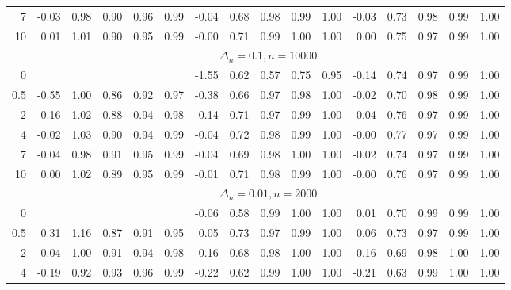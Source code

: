 \documentclass{article}
\theoremstyle{plain}
\theoremstyle{definition}
\theoremstyle{remark}
\begin{document}
\begin{appendix}
{\begin{table}[ht]
\begin{tabular}{r|rrrrr|rrrrr|rrrrr}
  7 & -0.03 & 0.98 & 0.90 & 0.96 & 0.99 & -0.04 & 0.68 & 0.98 & 0.99 & 1.00 & -0.03 & 0.73 & 0.98 & 0.99 & 1.00 \\ 
  10 & 0.01 & 1.01 & 0.90 & 0.95 & 0.99 & -0.00 & 0.71 & 0.99 & 1.00 & 1.00 & 0.00 & 0.75 & 0.97 & 0.99 & 1.00 \\ 
		\midrule
	&\multicolumn{15}{c}{$\Delta_n=0.1, n= 10000$}
	\\
0 &  &  &  &  & & -1.55 & 0.62 & 0.57 & 0.75 & 0.95 & -0.14 & 0.74 & 0.97 & 0.99 & 1.00 \\ 
  0.5 & -0.55 & 1.00 & 0.86 & 0.92 & 0.97 & -0.38 & 0.66 & 0.97 & 0.98 & 1.00 & -0.02 & 0.70 & 0.98 & 0.99 & 1.00 \\ 
  2 & -0.16 & 1.02 & 0.88 & 0.94 & 0.98 & -0.14 & 0.71 & 0.97 & 0.99 & 1.00 & -0.04 & 0.76 & 0.97 & 0.99 & 1.00 \\ 
  4 & -0.02 & 1.03 & 0.90 & 0.94 & 0.99 & -0.04 & 0.72 & 0.98 & 0.99 & 1.00 & -0.00 & 0.77 & 0.97 & 0.99 & 1.00 \\ 
  7 & -0.04 & 0.98 & 0.91 & 0.95 & 0.99 & -0.04 & 0.69 & 0.98 & 1.00 & 1.00 & -0.02 & 0.74 & 0.97 & 0.99 & 1.00 \\ 
  10 & 0.00 & 1.02 & 0.89 & 0.95 & 0.99 & -0.01 & 0.71 & 0.98 & 0.99 & 1.00 & -0.00 & 0.76 & 0.97 & 0.99 & 1.00 \\ 
	\midrule
	\midrule
	&\multicolumn{15}{c}{$\Delta_n=0.01, n= 2000$}
	\\
0 &  &  &  &  &  & -0.06 & 0.58 & 0.99 & 1.00 & 1.00 & 0.01 & 0.70 & 0.99 & 0.99 & 1.00 \\ 
  0.5 & 0.31 & 1.16 & 0.87 & 0.91 & 0.95 & 0.05 & 0.73 & 0.97 & 0.99 & 1.00 & 0.06 & 0.73 & 0.97 & 0.99 & 1.00 \\ 
  2 & -0.04 & 1.00 & 0.91 & 0.94 & 0.98 & -0.16 & 0.68 & 0.98 & 1.00 & 1.00 & -0.16 & 0.69 & 0.98 & 1.00 & 1.00 \\ 
  4 & -0.19 & 0.92 & 0.93 & 0.96 & 0.99 & -0.22 & 0.62 & 0.99 & 1.00 & 1.00 & -0.21 & 0.63 & 0.99 & 1.00 & 1.00 \\ 

\end{tabular}
\end{table}}
\end{appendix}
\end{document}
